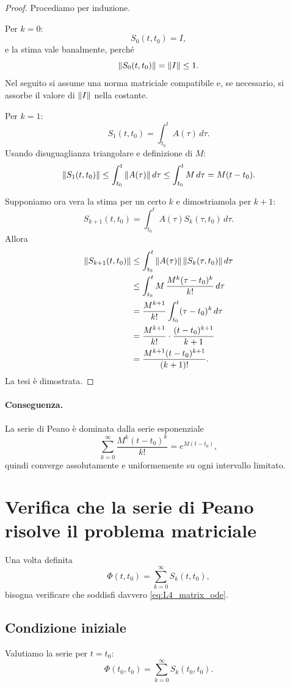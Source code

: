 \begin{proof}
Procediamo per induzione.

Per $k=0$:
\[
S_0(t,t_0)=I,
\]
e la stima vale banalmente, perché
\[
\norm{S_0(t,t_0)}=\norm{I}\le 1.
\]
Nel seguito si assume una norma matriciale compatibile e, se necessario, si assorbe il valore di $\norm{I}$ nella costante.

Per $k=1$:
\[
S_1(t,t_0)=\int_{t_0}^{t}A(\tau)\,d\tau.
\]
Usando disuguaglianza triangolare e definizione di $M$:
\[
\norm{S_1(t,t_0)}
\le
\int_{t_0}^{t}\norm{A(\tau)}\,d\tau
\le
\int_{t_0}^{t}M\,d\tau
=
M(t-t_0).
\]

Supponiamo ora vera la stima per un certo $k$ e dimostriamola per $k+1$:
\[
S_{k+1}(t,t_0)=\int_{t_0}^{t}A(\tau)S_k(\tau,t_0)\,d\tau.
\]
Allora
\begin{align*}
\norm{S_{k+1}(t,t_0)}
&\le
\int_{t_0}^{t}\norm{A(\tau)}\,\norm{S_k(\tau,t_0)}\,d\tau\\
&\le
\int_{t_0}^{t}
M\,
\frac{M^k(\tau-t_0)^k}{k!}
\,d\tau\\
&=
\frac{M^{k+1}}{k!}\int_{t_0}^{t}(\tau-t_0)^k\,d\tau\\
&=
\frac{M^{k+1}}{k!}\cdot \frac{(t-t_0)^{k+1}}{k+1}\\
&=
\frac{M^{k+1}(t-t_0)^{k+1}}{(k+1)!}.
\end{align*}
La tesi è dimostrata.
\end{proof}

\paragraph{Conseguenza.}
La serie di Peano è dominata dalla serie esponenziale
\[
\sum_{k=0}^{\infty}\frac{M^k(t-t_0)^k}{k!}=e^{M(t-t_0)},
\]
quindi converge assolutamente e uniformemente su ogni intervallo limitato.

\section{Verifica che la serie di Peano risolve il problema matriciale}

Una volta definita
\[
\Phi(t,t_0)=\sum_{k=0}^{\infty}S_k(t,t_0),
\]
bisogna verificare che soddisfi davvero \eqref{eq:L4_matrix_ode}.

\subsection{Condizione iniziale}

Valutiamo la serie per $t=t_0$:
\[
\Phi(t_0,t_0)=\sum_{k=0}^{\infty}S_k(t_0,t_0).
\]

